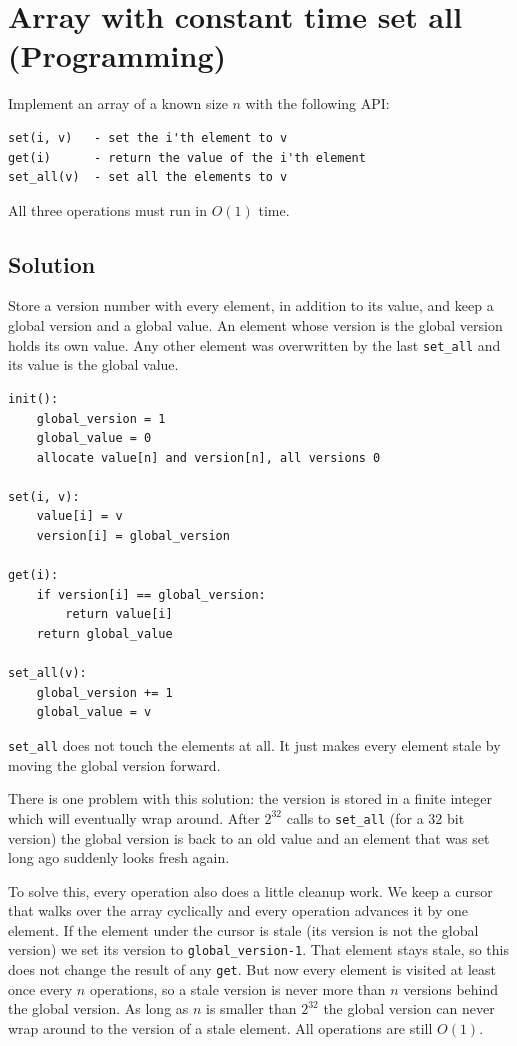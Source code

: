 \section {Array with constant time set all (Programming)}

Implement an array of a known size $n$ with the following API:

\begin{verbatim}
set(i, v)   - set the i'th element to v
get(i)      - return the value of the i'th element
set_all(v)  - set all the elements to v
\end{verbatim}

All three operations must run in $O(1)$ time.

\subsection{Solution}

Store a version number with every element, in addition to its value, and keep a global version
and a global value. An element whose version is the global version holds its own value.
Any other element was overwritten by the last \verb|set_all| and its value is the global value.

\begin{verbatim}
init():
    global_version = 1
    global_value = 0
    allocate value[n] and version[n], all versions 0

set(i, v):
    value[i] = v
    version[i] = global_version

get(i):
    if version[i] == global_version:
        return value[i]
    return global_value

set_all(v):
    global_version += 1
    global_value = v
\end{verbatim}

\verb|set_all| does not touch the elements at all. It just makes every element stale by moving the global version forward.

There is one problem with this solution: the version is stored in a finite integer which will
eventually wrap around. After $2^{32}$ calls to \verb|set_all| (for a 32 bit version) the global
version is back to an old value and an element that was set long ago suddenly looks fresh again.

To solve this, every operation also does a little cleanup work. We keep a cursor that walks over
the array cyclically and every operation advances it by one element. If the element under the cursor
is stale (its version is not the global version) we set its version to \verb|global_version-1|.
That element stays stale, so this does not change the result of any \verb|get|.
But now every element is visited at least once every $n$ operations, so a stale version is never more
than $n$ versions behind the global version. As long as $n$ is smaller than $2^{32}$ the global version
can never wrap around to the version of a stale element.
All operations are still $O(1)$.
